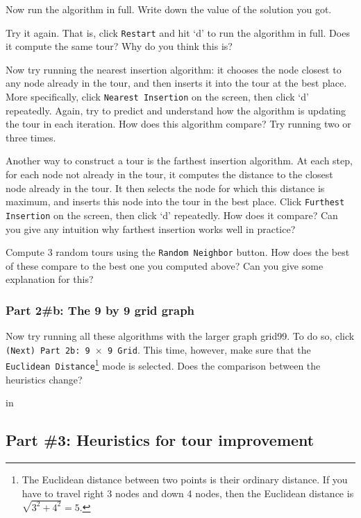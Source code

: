 \documentclass[twoside]{article}%
\begin{document}
\vskip 1in

\noindent Now run the algorithm in full. Write
down the value of the solution you got. 

\vskip 1in 

\noindent Try it again. That is, click \texttt{Restart} and hit `d' to run the algorithm in full. 
Does it compute the same tour? Why do you think this is? 

\vskip 1in 
\noindent Now try running the nearest insertion
algorithm: it chooses the node closest to any node already in the
tour, and then inserts it into the tour at the best place. More
specifically, click \texttt{Nearest Insertion} on the screen, then click `d' repeatedly.  
Again, try to predict and understand how the algorithm is updating the tour in
each iteration. How does this algorithm compare? Try running two or three times.

\vskip 2in

 \noindent Another way to construct a tour is the
farthest insertion algorithm.  At each step, for each node not
already in the tour, it computes the distance to the closest node
already in the tour.  It then selects the node for which this
distance is maximum, and inserts this node into the tour in the
best place.  Click \texttt{Furthest Insertion} on the screen, then click `d' repeatedly.   How does it compare? Can you give 
any intuition why farthest insertion works well in practice?

\vskip 2in
\noindent
Compute 3 random tours using the  \texttt{Random Neighbor} button. How does the best of these compare to the
best one you computed above? Can you give some explanation for this? 

\vskip 2in 
\subsubsection*{Part 2\#b: The 9 by 9 grid graph}
\noindent Now try running all these algorithms with the larger graph grid99.  To do so, click \texttt{(Next) Part 2b: 9 $\times$ 9 Grid}.  This time, however, make sure that the  \texttt{Euclidean Distance}\footnote{The Euclidean distance between two points is their ordinary distance.  If you have to travel right 3 nodes and down 4 nodes, then the Euclidean distance is $\sqrt{3^2+4^2}=5.$} mode is selected. Does the comparison between the heuristics change?

 in

\subsection*{Part \#3: Heuristics for tour improvement}
\end{document}
